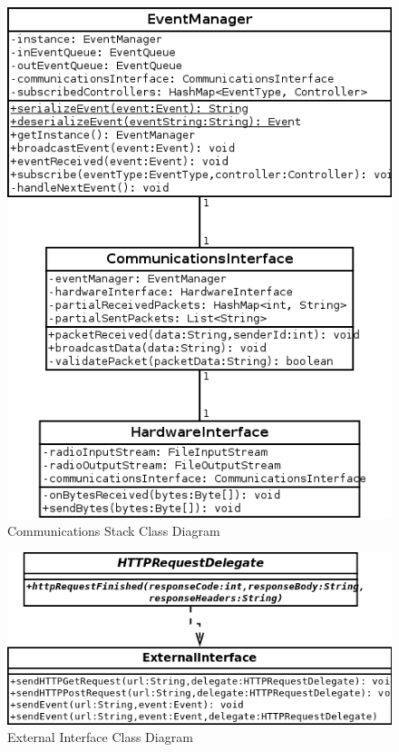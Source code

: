\documentclass{report}
\begin{document}
\begin{figure}[p]
  \centering
  \caption{Communications Stack Class Diagram}
  \label{fig:communications_stack_class_diagram}
  \includegraphics[scale=0.5]{communication_stack_class_diagram}
\end{figure}

\begin{figure}[p]
    \centering
    \label{fig:external_interface_class_diagram}
    \caption{External Interface Class Diagram}
    \includegraphics[scale=0.5]{external_interface_class_diagram}
\end{figure}
\end{document}
